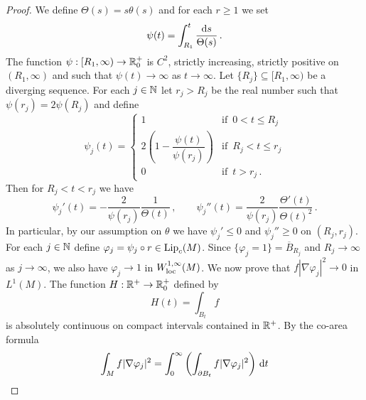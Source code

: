 \documentclass[10 pt,a4paper]{article}
\theoremstyle{definition}
\begin{document}
\begin{proof}
	We define $\Theta(s) = s\theta(s)$ and for each $r\geq 1$ we set
	\[
	\psi(t) = \int_{R_1}^t \frac{\mathrm{d} s}{\Theta(s)} \, .
	\]
	The function $\psi : [R_1,\infty) \to \mathbb R^+_0$ is $C^2$, strictly increasing, strictly positive on $(R_1,\infty)$ and such that $\psi(t) \to \infty$ as $t\to\infty$. Let $\{R_j\} \subseteq [R_1,\infty)$ be a diverging sequence. For each $j\in\mathbb N$ let $r_j > R_j$ be the real number such that $\psi(r_j) = 2\psi(R_j)$ and define
	\[
	\psi_j(t) = \begin{cases}
		1 & \text{if } \, 0 < t \leq R_j \\
		2\left(1-\dfrac{\psi(t)}{\psi(r_j)}\right) & \text{if } \, R_j < t \leq r_j \\
		0 & \text{if } \, t > r_j \, .
	\end{cases}
	\]
	Then for $R_j < t < r_j$ we have
	\[
	\psi_j'(t) = -\frac{2}{\psi(r_j)} \frac{1}{\Theta(t)} \, , \qquad \psi_j''(t) = \frac{2}{\psi(r_j)} \frac{\Theta'(t)}{\Theta(t)^2} \, .
	\]
	In particular, by our assumption on $\theta$ we have $\psi_j'\leq 0$ and $\psi_j''\geq 0$ on $(R_j,r_j)$. 
	For each $j\in\mathbb N$ define $\varphi_j = \psi_j\circ r \in \mathrm{Lip}_c(M)$. 
	Since $\{\varphi_j = 1\} = \overline{B}_{R_j}$ and $R_j\to\infty$ as $j\to\infty$, we also have $\varphi_j \to 1$ in $W^{1,\infty}_{\mathrm{loc}}(M)$. We now prove that $f|\nabla\varphi_j|^2 \to 0$ in $L^1(M)$. The function $H : \mathbb R^+ \to \mathbb R^+_0$ defined by
	\[
	H(t) = \int_{B_t} f
	\]
	is absolutely continuous on compact intervals contained in $\mathbb R^+$. By the co-area formula
	\begin{align*}
		\int_M f|\nabla\varphi_j|^2 & = \int_0^\infty \left(\int_{\partial B_t} f|\nabla\varphi_j|^2 \right) \, \di t \\

\end{align*}
\end{proof}
\end{document}
